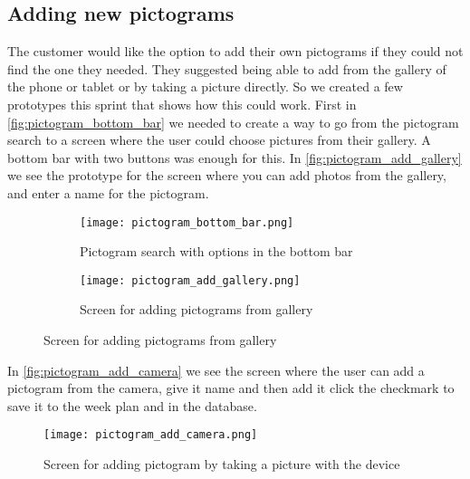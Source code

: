 \subsection{Adding new pictograms}
The customer would like the option to add their own pictograms if they could not find the one they needed. They suggested being able to add from the gallery of the phone or tablet or by taking a picture directly. So we created a few prototypes this sprint that shows how this could work. First in \autoref{fig:pictogram_bottom_bar} we needed to create a way to go from the pictogram search to a screen where the user could choose pictures from their gallery.
A bottom bar with two buttons was enough for this. In \autoref{fig:pictogram_add_gallery} we see the prototype for the screen where you can add photos from the gallery, and enter a name for the pictogram.
\begin{figure}[H]
    \begin{subfigure}{0.5\textwidth}
    \texttt{[image: pictogram\_bottom\_bar.png]} 
    \caption{Pictogram search with options in the bottom bar}
    \label{fig:pictogram_bottom_bar}
    \end{subfigure}
    \begin{subfigure}{0.5\textwidth}
        \texttt{[image: pictogram\_add\_gallery.png]}
    \caption{Screen for adding pictograms from gallery}
    \label{fig:pictogram_add_gallery}
    \end{subfigure} 
\end{figure}
In \autoref{fig:pictogram_add_camera} we see the screen where the user can add a pictogram from the camera, give it name and then add it click the checkmark to save it to the week plan and in the database.

\begin{figure}
    \centering
    \texttt{[image: pictogram\_add\_camera.png]}
    \caption{Screen for adding pictogram by taking a picture with the device}
    \label{fig:pictogram_add_camera}
\end{figure}